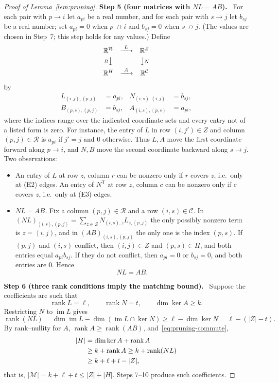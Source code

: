 \documentclass[11pt]{article}
\theoremstyle{remark}
\newcommand{\abs}[1]{\lvert #1\rvert}
\DeclareMathOperator{\rank}{rank}
\DeclareMathOperator{\im}{im}
\newcommand{\R}{\mathbb R}
\newcommand{\step}[1]{\par\medskip\noindent\textbf{Step #1.}\ }
\begin{document}
\begin{proof}[Proof of Lemma~\ref{lem:pruning}]
\step{5 (four matrices with $NL=AB$)}
For each pair with $p\to i$ let $a_{pi}$ be a real number, and for each pair
with $s\to j$ let $b_{sj}$ be a real number; set $a_{pi}=0$ when
$p\not\to i$ and $b_{sj}=0$ when $s\not\to j$. (The values are chosen in
Step~7; this step holds for any values.) Define
\[
 \begin{array}{ccc}
 \R^{\mathcal R}&\xrightarrow{\ L\ }&\R^Z\\[3pt]
 {\scriptstyle B}\big\downarrow&&\big\downarrow{\scriptstyle N}\\[3pt]
 \R^H&\xrightarrow{\ A\ }&\R^{\mathcal C}
 \end{array}
\]
by
\begin{equation}\label{eq:pruning-maps}
 \begin{aligned}
 L_{(i,j),(p,j)}&=a_{pi},&
 N_{(i,s),(i,j)}&=b_{sj},\\
 B_{(p,s),(p,j)}&=b_{sj},&
 A_{(i,s),(p,s)}&=a_{pi},
 \end{aligned}
\end{equation}
where the indices range over the indicated coordinate sets and every entry
not of a listed form is zero. For instance, the entry of $L$ in row
$(i,j')\in Z$ and column $(p,j)\in\mathcal R$ is $a_{pi}$ if $j'=j$ and $0$
otherwise. Thus $L,A$ move the first coordinate forward along $p\to i$, and
$N,B$ move the second coordinate backward along $s\to j$. Two observations:
\begin{itemize}[leftmargin=2em,itemsep=1pt]
\item An entry of $L$ at row $z$, column $r$ can be nonzero only if $r$
covers $z$, i.e.\ only at (E2) edges. An entry of $N^{\mathsf T}$ at row $z$,
column $c$ can be nonzero only if $c$ covers $z$, i.e.\ only at (E3) edges.
\item \emph{$NL=AB$.} Fix a column $(p,j)\in\mathcal R$ and a row
$(i,s)\in\mathcal C$. In $(NL)_{(i,s),(p,j)}=\sum_{z\in Z}N_{(i,s),z}L_{z,(p,j)}$
the only possibly nonzero term is $z=(i,j)$, and in $(AB)_{(i,s),(p,j)}$ the
only one is the index $(p,s)$. If $(p,j)$ and $(i,s)$ conflict, then
$(i,j)\in Z$ and $(p,s)\in H$, and both entries equal $a_{pi}b_{sj}$. If they
do not conflict, then $a_{pi}=0$ or $b_{sj}=0$, and both entries are $0$.
Hence
\begin{equation}\label{eq:pruning-commute}
 NL=AB.
\end{equation}
\end{itemize}

\step{6 (three rank conditions imply the matching bound)}
Suppose the coefficients are such that
\[
 \rank L=\ell,\qquad \rank N=t,\qquad \dim\ker A\geq k.
\]
Restricting $N$ to $\im L$ gives
\[
 \rank(NL)
 =\dim\im L-\dim(\im L\cap\ker N)
 \geq\ell-\dim\ker N=\ell-(\abs Z-t).
\]
By rank--nullity for $A$, $\rank A\ge\rank(AB)$,
and~\eqref{eq:pruning-commute},
\begin{align}
 \abs H
 &=\dim\ker A+\rank A\notag\\
 &\geq k+\rank A
 \geq k+\rank(NL)\notag\\
 &\geq k+\ell+t-\abs Z,
 \label{eq:pruning-rank-bound}
\end{align}
that is, $\abs{\mathcal M}=k+\ell+t\le\abs Z+\abs H$. Steps 7--10 produce such
coefficients.


\end{proof}
\end{document}
